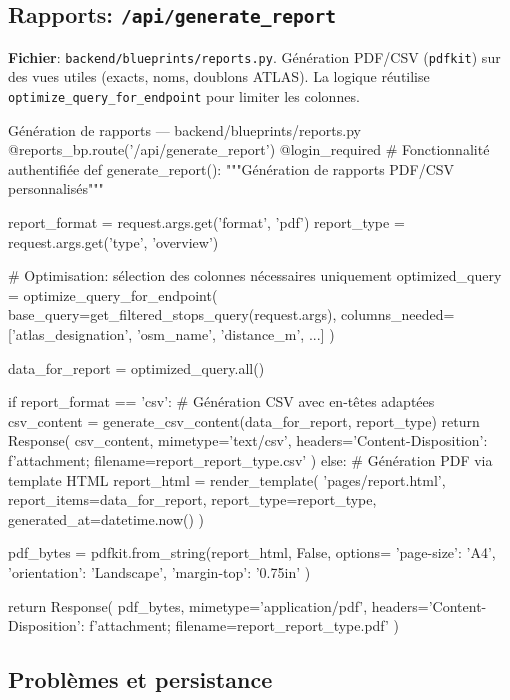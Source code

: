 \subsection{Rapports: \texttt{/api/generate\_report}}

\textbf{Fichier}: \texttt{backend/blueprints/reports.py}. Génération PDF/CSV (\texttt{pdfkit}) sur des vues utiles (exacts, noms, doublons ATLAS). La logique réutilise \texttt{optimize\_query\_for\_endpoint} pour limiter les colonnes.

\begin{codebox}[language=Python]{Génération de rapports — backend/blueprints/reports.py}
@reports_bp.route('/api/generate_report')
@login_required  # Fonctionnalité authentifiée
def generate_report():
    """Génération de rapports PDF/CSV personnalisés"""
    
    report_format = request.args.get('format', 'pdf')
    report_type = request.args.get('type', 'overview')
    
    # Optimisation: sélection des colonnes nécessaires uniquement
    optimized_query = optimize_query_for_endpoint(
        base_query=get_filtered_stops_query(request.args),
        columns_needed=['atlas_designation', 'osm_name', 'distance_m', ...]
    )
    
    data_for_report = optimized_query.all()
    
    if report_format == 'csv':
        # Génération CSV avec en-têtes adaptées
        csv_content = generate_csv_content(data_for_report, report_type)
        return Response(
            csv_content,
            mimetype='text/csv',
            headers={'Content-Disposition': f'attachment; filename=report_{report_type}.csv'}
        )
    else:
        # Génération PDF via template HTML
        report_html = render_template(
            'pages/report.html', 
            report_items=data_for_report,
            report_type=report_type,
            generated_at=datetime.now()
        )
        
        pdf_bytes = pdfkit.from_string(report_html, False, options={
            'page-size': 'A4',
            'orientation': 'Landscape',
            'margin-top': '0.75in'
        })
        
        return Response(
            pdf_bytes,
            mimetype='application/pdf',
            headers={'Content-Disposition': f'attachment; filename=report_{report_type}.pdf'}
        )
\end{codebox}

\subsection{Problèmes et persistance}

